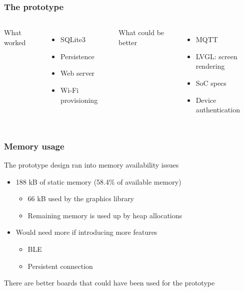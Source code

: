 \documentclass{beamer}
\begin{document}
\frame{\titlepage}

\begin{frame}
  \frametitle{The prototype}

  \begin{columns}
    What worked
    \begin{itemize}
      \item SQLite3
      \item Persistence
      \item Web server
      \item Wi-Fi provisioning
    \end{itemize}

    What could be better
    \begin{itemize}
      \item MQTT
      \item LVGL: screen rendering
      \item SoC specs
      \item Device authentication
    \end{itemize}
  \end{columns}


\end{frame}

\begin{frame}
  \frametitle{Memory usage}

  The prototype design ran into memory availability issues
  \begin{itemize}
    \item 188 kB of static memory (58.4\% of available memory)
    \begin{itemize}
      \item 66 kB used by the graphics library
      \item Remaining memory is used up by heap allocations
    \end{itemize}
    \item Would need more if introducing more features
    \begin{itemize}
      \item BLE
      \item Persistent connection
    \end{itemize}
  \end{itemize}
  There are better boards that could have been used for the prototype

\end{frame}
\end{document}
